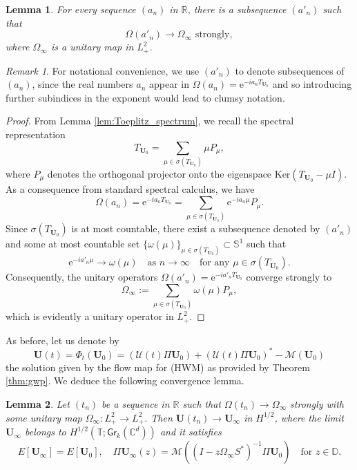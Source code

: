 \documentclass[10pt,reqno,a4paper]{amsart}
\newtheorem{lem}{Lemma}[section]
\theoremstyle{definition}
\theoremstyle{remark}
\theoremstyle{remark}
\newtheorem*{remark*}{Remark}
\numberwithin{equation}{section}
\newcommand{\C}{\mathbb{C}}
\newcommand{\R}{\mathbb{R}}
\newcommand{\T}{\mathbb{T}}
\newcommand{\D}{\mathbb{D}}
\newcommand{\Ss}{\mathbb{S}}
\newcommand{\Mean}{\mathscr{M}}
\renewcommand{\ker}{\mathrm{Ker}}
\newcommand{\eu}{\mathrm{e}}
\newcommand{\Ub}{\mathbf{U}}
\newcommand{\id}{I}
\newcommand{\Gr}{\mathsf{Gr}}
\newcommand{\Om}{\Omega}
\newcommand{\Us}{\mathscr{U}}
\begin{document}
\begin{lem} \label{lem:ap_compact}
For every sequence $(a_n)$ in $\R$, there is a subsequence  $(a'_n)$ such that
$$
\mbox{$\Om(a'_n) \to \Om_\infty$ strongly},
$$
where $\Om_\infty$ is a unitary map in $L^2_+$. 
\end{lem}

\begin{remark*}
For notational convenience, we use $(a'_n)$ to denote subsequences of $(a_n)$, since the real numbers $a_n$ appear in $\Om(a_n) = \eu^{-i a_n T_{\Ub_0}}$ and so introducing further subindices in the exponent would lead to clumsy notation.
\end{remark*}

\begin{proof}
From Lemma \ref{lem:Toeplitz_spectrum}, we recall the spectral representation
$$
T_{\Ub_0} = \sum_{\mu \in \sigma(T_{\Ub_0})} \mu P_\mu,
$$
where $P_\mu$ denotes the orthogonal projector onto the eigenspace $\ker(T_{\Ub_0} - \mu \id)$. As a consequence from standard spectral calculus, we have
$$
\Om(a_n) = \eu^{-i a_n T_{\Ub_0}} = \sum_{\mu \in \sigma(T_{\Ub_0})} \eu^{-i a_n \mu} P_\mu.
$$
Since $\sigma(T_{\Ub_0})$ is at most countable, there exist a subsequence denoted by $(a'_n)$ and some at most countable set $\{ \omega(\mu) \}_{\mu \in \sigma(T_{\Ub_0})} \subset \Ss^1$ such that
$$
\eu^{-i a'_n \mu} \to \omega(\mu) \quad \mbox{as $n \to \infty$} \quad \mbox{for any $\mu \in \sigma(T_{\Ub_0})$}.
$$
Consequently, the unitary operators $\Om(a'_n)=\eu^{-i a'_n T_{\Ub_0}}$  converge strongly to 
$$
\Om_\infty := \sum_{\mu \in \sigma(T_{\Ub_0})} \omega(\mu) P_\mu,
$$
which is evidently a unitary operator in $L^2_+$. 
\end{proof}

As before, let us denote by
$$
\Ub(t) = \Phi_t(\Ub_0) = (\Us(t) \Pi \Ub_0) + (\Us(t) \Pi \Ub_0)^* - \Mean(\Ub_0)
$$
 the solution given by the flow map for (HWM) as provided by Theorem \ref{thm:gwp}. We deduce  the following convergence lemma.

\begin{lem} \label{lem:ap_convergence}
Let $(t_n)$ be a sequence in $\R$ such that $\Om(t_n) \to \Om_\infty$ strongly with some unitary map $\Om_\infty :L^2_+ \to L^2_+$. Then $\Ub(t_n) \to \Ub_\infty$ in $H^{1/2}$, where the limit $\Ub_\infty$ belongs to $H^{1/2}(\T; \Gr_k(\C^d))$ and it satisfies 
$$
E[\Ub_\infty] = E[\Ub_0], \quad \Pi \Ub_\infty(z) = \Mean ( (\id - z  \Om_\infty S^*)^{-1} \Pi \Ub_0) \quad \mbox{for $z \in \D$}.
$$

\end{lem}
\end{document}
